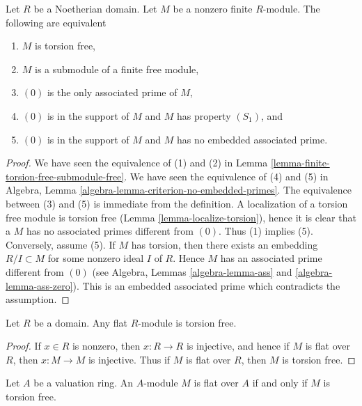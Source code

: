 \begin{lemma}
\label{lemma-torsion-free-finite-noetherian-domain}
Let $R$ be a Noetherian domain. Let $M$ be a nonzero finite $R$-module.
The following are equivalent
\begin{enumerate}
\item $M$ is torsion free,
\item $M$ is a submodule of a finite free module,
\item $(0)$ is the only associated prime of $M$,
\item $(0)$ is in the support of $M$ and $M$ has property $(S_1)$, and
\item $(0)$ is in the support of $M$ and $M$ has no embedded associated prime.
\end{enumerate}
\end{lemma}

\begin{proof}
We have seen the equivalence of (1) and (2) in
Lemma \ref{lemma-finite-torsion-free-submodule-free}.
We have seen the equivalence of (4) and (5) in
Algebra, Lemma \ref{algebra-lemma-criterion-no-embedded-primes}.
The equivalence between (3) and (5) is immediate from the definition.
A localization of a torsion free module is torsion free
(Lemma \ref{lemma-localize-torsion}), hence it is clear that a
$M$ has no associated primes different from $(0)$. Thus (1)
implies (5). Conversely, assume (5). If $M$ has torsion,
then there exists an embedding $R/I \subset M$ for some nonzero
ideal $I$ of $R$. Hence $M$ has an associated prime different
from $(0)$
(see Algebra, Lemmas \ref{algebra-lemma-ass} and \ref{algebra-lemma-ass-zero}).
This is an embedded associated prime which contradicts the assumption.
\end{proof}

\begin{lemma}
\label{lemma-flat-torsion-free}
Let $R$ be a domain. Any flat $R$-module is torsion free.
\end{lemma}

\begin{proof}
If $x \in R$ is nonzero, then $x : R \to R$ is injective, and hence if $M$
is flat over $R$, then $x : M \to M$ is injective. Thus if $M$ is flat over
$R$, then $M$ is torsion free.
\end{proof}

\begin{lemma}
\label{lemma-valuation-ring-torsion-free-flat}
Let $A$ be a valuation ring.
An $A$-module $M$ is flat over $A$ if and only if $M$ is torsion free.
\end{lemma}

